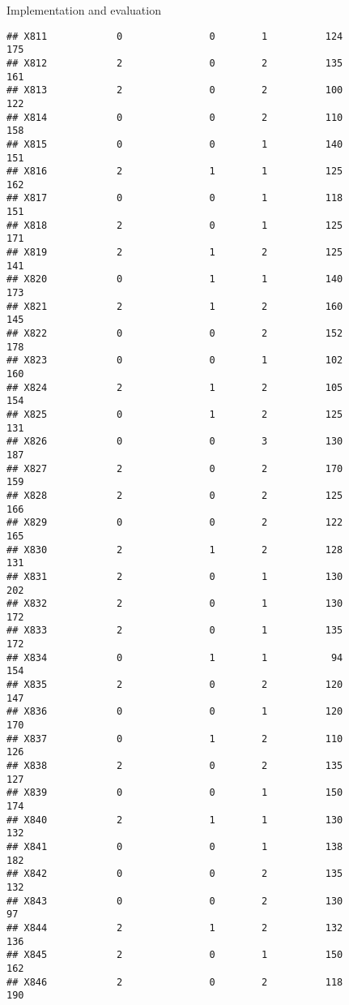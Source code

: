 \documentclass[
  ignorenonframetext,
]{beamer}
\begin{document}
\begin{frame}[fragile]{Implementation and evaluation}
\begin{verbatim}
## X811            0               0        1          124            175
## X812            2               0        2          135            161
## X813            2               0        2          100            122
## X814            0               0        2          110            158
## X815            0               0        1          140            151
## X816            2               1        1          125            162
## X817            0               0        1          118            151
## X818            2               0        1          125            171
## X819            2               1        2          125            141
## X820            0               1        1          140            173
## X821            2               1        2          160            145
## X822            0               0        2          152            178
## X823            0               0        1          102            160
## X824            2               1        2          105            154
## X825            0               1        2          125            131
## X826            0               0        3          130            187
## X827            2               0        2          170            159
## X828            2               0        2          125            166
## X829            0               0        2          122            165
## X830            2               1        2          128            131
## X831            2               0        1          130            202
## X832            2               0        1          130            172
## X833            2               0        1          135            172
## X834            0               1        1           94            154
## X835            2               0        2          120            147
## X836            0               0        1          120            170
## X837            0               1        2          110            126
## X838            2               0        2          135            127
## X839            0               0        1          150            174
## X840            2               1        1          130            132
## X841            0               0        1          138            182
## X842            0               0        2          135            132
## X843            0               0        2          130             97
## X844            2               1        2          132            136
## X845            2               0        1          150            162
## X846            2               0        2          118            190

\end{verbatim}
\end{frame}
\end{document}
